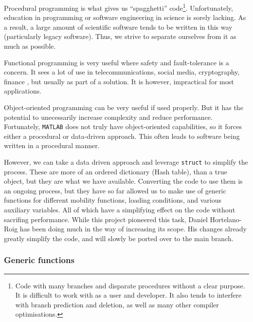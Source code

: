 Procedural programming is what gives us ``spagghetti'' code\footnote{Code with many branches and disparate procedures without a clear purpose. It is difficult to work with as a user and developer. It also tends to interfere with branch prediction and deletion, as well as many other compiler optimisations.}. Unfortunately, education in programming or software engineering in science is sorely lacking. As a result, a large amount of scientific software tends to be written in this way (particularly legacy software). Thus, we strive to separate ourselves from it as much as possible.

Functional programming is very useful where safety and fault-tolerance is a concern. It sees a lot of use in telecommunications, social media, cryptography, finance \cite{haskell,functionalProg}, but usually as part of a solution. It is however, impractical for most applications.

Object-oriented programming can be very useful if used properly. But it has the potential to unecessarily increase complexity and reduce performance. Fortunately, \texttt{MATLAB} does not truly have object-oriented capabilities, so it forces either a procedural or data-driven approach. This often leads to software being written in a procedural manner.

However, we can take a data driven approach and leverage \texttt{struct} to simplify the process. These are more of an ordered dictionary (Hash table), than a true object, but they are what we have available. Converting the code to use them is an ongoing process, but they have so far allowed us to make use of generic functions for different mobility functions, loading conditions, and various auxiliary variables. All of which have a simplifying effect on the code without sacrifing performance. While this project pioneered this task, Daniel Hortelano-Roig has been doing much in the way of increasing its scope. His changes already greatly simplify the code, and will slowly be ported over to the main branch.

\subsubsection{Generic functions}\label{ss:genFun}

